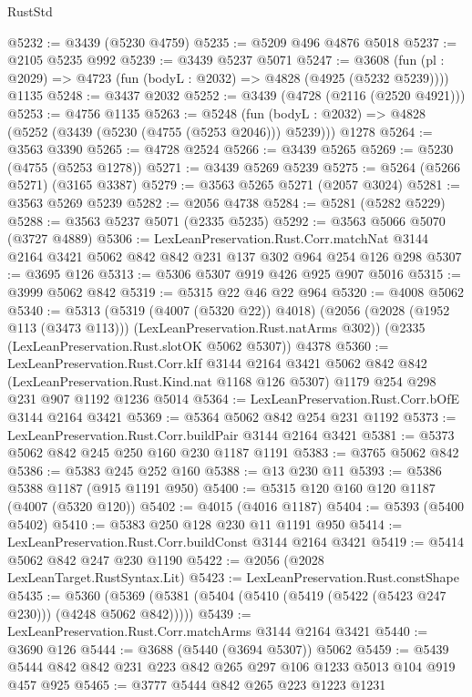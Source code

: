 \begin{lexlean}{RustStd}
\begin{coremodule}
@5232 := @3439 (@5230 @4759)
@5235 := @5209 @496 @4876 @5018
@5237 := @2105 @5235 @992
@5239 := @3439 @5237 @5071
@5247 := @3608
    (fun (pl : @2029) => @4723 (fun (bodyL : @2032) => @4828 (@4925 (@5232 @5239))))
    @1135
@5248 := @3437 @2032
@5252 := @3439 (@4728 (@2116 (@2520 @4921)))
@5253 := @4756 @1135
@5263 := @5248
    (fun (bodyL : @2032) => @4828 (@5252 (@3439 (@5230 (@4755 (@5253 @2046))) @5239)))
    @1278
@5264 := @3563 @3390
@5265 := @4728 @2524
@5266 := @3439 @5265
@5269 := @5230 (@4755 (@5253 @1278))
@5271 := @3439 @5269 @5239
@5275 := @5264 (@5266 @5271) (@3165 @3387)
@5279 := @3563 @5265 @5271 (@2057 @3024)
@5281 := @3563 @5269 @5239
@5282 := @2056 @4738
@5284 := @5281 (@5282 @5229)
@5288 := @3563 @5237 @5071 (@2335 @5235)
@5292 := @3563 @5066 @5070 (@3727 @4889)
@5306 := LexLeanPreservation.Rust.Corr.matchNat
    @3144
    @2164
    @3421
    @5062
    @842
    @842
    @231
    @137
    @302
    @964
    @254
    @126
    @298
@5307 := @3695 @126
@5313 := @5306 @5307 @919 @426 @925 @907 @5016
@5315 := @3999 @5062 @842
@5319 := @5315 @22 @46 @22 @964
@5320 := @4008 @5062
@5340 := @5313
    (@5319 (@4007 (@5320 @22)) @4018)
    (@2056 (@2028 (@1952 @113 (@3473 @113))) (LexLeanPreservation.Rust.natArms @302))
    (@2335 (LexLeanPreservation.Rust.slotOK @5062 @5307))
    @4378
@5360 := LexLeanPreservation.Rust.Corr.kIf
    @3144
    @2164
    @3421
    @5062
    @842
    @842
    (LexLeanPreservation.Rust.Kind.nat @1168 @126 @5307)
    @1179
    @254
    @298
    @231
    @907
    @1192
    @1236
    @5014
@5364 := LexLeanPreservation.Rust.Corr.bOfE @3144 @2164 @3421
@5369 := @5364 @5062 @842 @254 @231 @1192
@5373 := LexLeanPreservation.Rust.Corr.buildPair @3144 @2164 @3421
@5381 := @5373 @5062 @842 @245 @250 @160 @230 @1187 @1191
@5383 := @3765 @5062 @842
@5386 := @5383 @245 @252 @160
@5388 := @13 @230 @11
@5393 := @5386 @5388 @1187 (@915 @1191 @950)
@5400 := @5315 @120 @160 @120 @1187 (@4007 (@5320 @120))
@5402 := @4015 (@4016 @1187)
@5404 := @5393 (@5400 @5402)
@5410 := @5383 @250 @128 @230 @11 @1191 @950
@5414 := LexLeanPreservation.Rust.Corr.buildConst @3144 @2164 @3421
@5419 := @5414 @5062 @842 @247 @230 @1190
@5422 := @2056 (@2028 LexLeanTarget.RustSyntax.Lit)
@5423 := LexLeanPreservation.Rust.constShape
@5435 := @5360 (@5369 (@5381 (@5404 (@5410 (@5419 (@5422 (@5423 @247 @230))) (@4248 @5062 @842)))))
@5439 := LexLeanPreservation.Rust.Corr.matchArms @3144 @2164 @3421
@5440 := @3690 @126
@5444 := @3688 (@5440 (@3694 @5307)) @5062
@5459 := @5439 @5444 @842 @842 @231 @223 @842 @265 @297 @106 @1233 @5013 @104 @919 @457 @925
@5465 := @3777 @5444 @842 @265 @223 @1223 @1231

\end{coremodule}
\end{lexlean}
